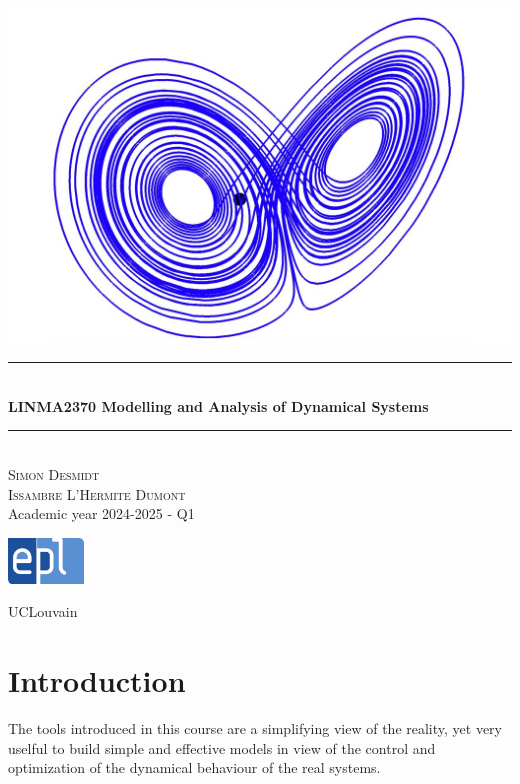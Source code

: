 \documentclass[12pt, openany]{report}
\theoremstyle{definition}
\newcommand{\HRule}{\rule{\linewidth}{0.5mm}}
\begin{document}
\begin{titlepage}
    \begin{sffamily}
    \begin{center}
        \includegraphics[scale=0.25]{img/page_de_garde.png} \\[1cm]
        \HRule \\[0.4cm]
        { \huge \bfseries LINMA2370 Modelling and Analysis of Dynamical Systems \\[0.4cm] }
    
        \HRule \\[1.5cm]
        \textsc{\LARGE Simon Desmidt\\Issambre L'Hermite Dumont}\\[1cm]
        \vfill
        \vspace{2cm}
        {\large Academic year 2024-2025 - Q1}
        \vspace{0.4cm}
         
        \includegraphics[width=0.15\textwidth]{img/epl.png}
        
        UCLouvain\\
    
    \end{center}
    \end{sffamily}
\end{titlepage}

\setcounter{tocdepth}{1}
\tableofcontents
\chapter{Introduction}
The tools introduced in this course are a simplifying view of the reality, yet very uselful to build simple and effective models in view of the control and optimization of the dynamical behaviour of the real systems.
\end{document}

